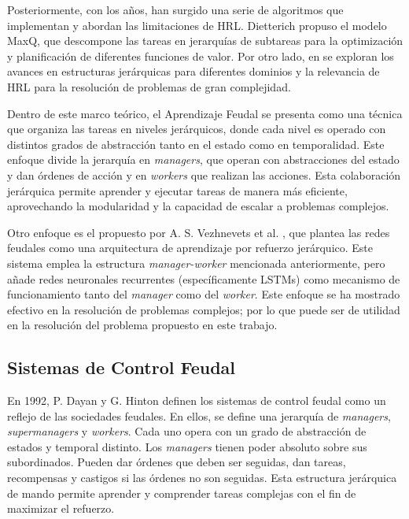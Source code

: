 \documentclass[letterpaper]{article} %
\begin{document}
Posteriormente, con los años, han surgido una serie de algoritmos que implementan y abordan las limitaciones de HRL. 
Dietterich \cite{dietterich2000hierarchical} propuso el modelo MaxQ, que descompone las tareas en jerarquías de subtareas
para la optimización y planificación de diferentes funciones de valor. Por otro lado, en \cite{barto2003recent} se exploran 
los avances en estructuras jerárquicas para diferentes dominios y la relevancia de HRL para la resolución de problemas de 
gran complejidad.  

Dentro de este marco teórico, el Aprendizaje Feudal se presenta como una técnica que organiza las tareas en niveles jerárquicos, donde cada nivel 
es operado con distintos grados de abstracción tanto en el estado como en temporalidad. Este enfoque \cite{dayan1992feudal} divide la jerarquía en \textit{managers}, que operan con abstracciones 
del estado y dan órdenes de acción y en \textit{workers} que realizan las acciones. Esta colaboración jerárquica permite aprender y ejecutar tareas de manera más eficiente, aprovechando
la modularidad y la capacidad de escalar a problemas complejos.

Otro enfoque es el propuesto por A. S. Vezhnevets et al. \cite{vezhnevets2017feudal}, que plantea las redes feudales como una arquitectura de aprendizaje por refuerzo jerárquico.
Este sistema emplea la estructura \textit{manager-worker} mencionada anteriormente, pero añade redes neuronales recurrentes (específicamente LSTMs) como mecanismo de funcionamiento tanto del 
\textit{manager} como del \textit{worker}. Este enfoque se ha mostrado efectivo en la resolución de problemas complejos; por lo que puede ser de utilidad en la resolución del problema propuesto en este trabajo.

\subsection{Sistemas de Control Feudal}
En 1992, P. Dayan y G. Hinton \cite{dayan1992feudal} definen los sistemas de control feudal como un reflejo de las sociedades feudales. En ellos, se 
define una jerarquía de \textit{managers}, \textit{supermanagers} y \textit{workers}. Cada uno opera con un grado de abstracción de estados y temporal
distinto. Los \textit{managers} tienen poder absoluto sobre sus subordinados. Pueden dar órdenes que deben ser seguidas, dan tareas, recompensas y castigos si 
las órdenes no son seguidas. Esta estructura jerárquica de mando permite aprender y comprender tareas complejas con el fin de maximizar el refuerzo.
\end{document}
